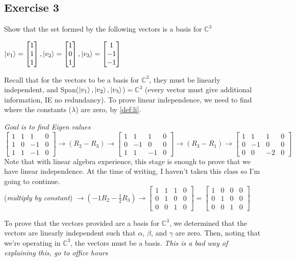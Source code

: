 \documentclass[12pt]{article}
\theoremstyle{plain}
\theoremstyle{nonumberplain}
\theoremstyle{plain}
\theoremstyle{nonumberplain}
\newcommand\1{{\bf 1}}
\newcommand{\bmat}[1]{\begin{bmatrix*} #1 \end{bmatrix*}} %
\newcommand{\C}{\mathbb{C}} %
\newcommand{\<}{\left\langle}
\renewcommand{\>}{\right\rangle}
\begin{document}
\subsection{Exercise 3}
Show that the set formed by the following vectors is a basis for $\C^3$
\begin{center}
$\ket{v_1}=\bmat{1 \\ 1 \\ 1}, \ket{v_2}=\bmat{1 \\ 0 \\ 1}, \ket{v_3}=\bmat{1 \\ -1 \\ -1}$
\end{center}
Recall that for the vectors to be a basis for $\C^3$, they must be linearly independent, and
Span($\ket{v_1},\ket{v_2},\ket{v_3}$)$=\C^3$ (every vector must give additional information, IE no redundancy). To prove linear independence, we need to find where the constants ($\lambda$) are zero, by \ref{def:li}. \\
\begin{center}
\textit{Goal is to find Eigen values }
$\bmat{1 & 1 & 1 & 0 \\ 1 & 0 & -1 & 0 \\ 1 & 1 & -1 & 0}\longrightarrow (R_2-R_3)\longrightarrow\bmat{1 & 1 & 1 & 0 \\ 0 & -1 & 0 & 0 \\ 1 & 1 & -1 & 0}\longrightarrow (R_3-R_1)\longrightarrow\bmat{1 & 1 & 1 & 0 \\ 0 & -1 & 0 & 0 \\ 0 & 0 & -2 & 0}$ \\
Note that with linear algebra experience, this stage is enough to prove that we have linear independence. At the time of writing, I haven't taken this class so I'm going to continue. \\
(\textit{multiply by constant})
$\longrightarrow (-1R_2-\frac{1}{2}R_3)\longrightarrow\bmat{1 & 1 & 1 & 0 \\ 0 & 1 & 0 & 0 \\ 0 & 0 & 1 & 0}=\bmat{1 & 0 & 0 & 0 \\ 0 & 1 & 0 & 0 \\ 0 & 0 & 1 & 0}$
\end{center}
To prove that the vectors provided are a basis for $\C^3$, we determined that the vectors are linearly independent such that $\alpha$, $\beta$, and $\gamma$ are zero. Then, noting that we're operating in $\C^3$, the vectors must be a basis. \textit{This is a bad way of explaining this, go to office hours}

\end{document}
